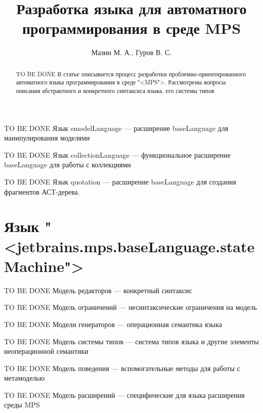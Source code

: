 \documentclass[a4paper,10pt]{article}
\title{Разработка языка для автоматного программирования в среде  MPS}
\author{Мазин М. А., Гуров В. С.}
\newcommand{\TBD}{\par{\LARGE TO BE DONE} }
\begin{document}
\maketitle

\begin{abstract}
\TBD
В статье описывается процесс разработки проблемно-ориентированного автоматного языка программирования в среде "<MPS">. Рассмотрены вопросы описания абстрактного и конкретного синтаксиса языка, его системы типов
\end{abstract}

\tableofcontents







\TBD Язык smodelLanguage — расширение baseLanguage для манипулирования моделями
\TBD Язык collectionLanguage — функциональное расширение baseLanguage для работы с коллекциями
\TBD Язык quotation — расширение baseLanguage для создания фрагментов АСТ-дерева.



\section{Язык "<jetbrains.mps.baseLanguage.stateMachine">}



\TBD Модель редакторов — конкретный синтаксис
\TBD Модель ограничений — несинтаксические ограничения на модель
\TBD Модели генераторов — операционная семантика языка
\TBD Модель системы типов — система типов языка и другие элементы неоперационной семантики
\TBD Модель поведения — вспомогательные методы для работы с метамоделью
\TBD Модель расширений — специфические для языка расширения среды MPS
\end{document}
